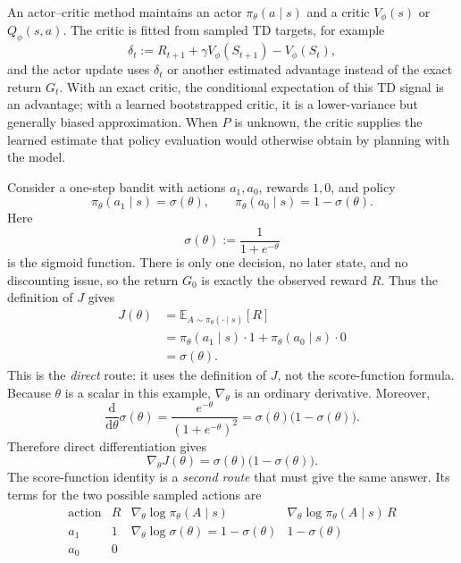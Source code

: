 \documentclass[11pt,a4paper]{article}
\theoremstyle{definition}
\begin{document}
\begin{definition}\label{def:actor-critic}
An actor--critic method maintains an actor $\pi_\theta(a\mid s)$ and a critic
$V_\phi(s)$ or $Q_\phi(s,a)$. The critic is fitted from sampled TD targets, for example
\[
\delta_t:=R_{t+1}+\gamma V_\phi(S_{t+1})-V_\phi(S_t),
\]
and the actor update uses $\delta_t$ or another estimated advantage instead of the exact
return $G_t$. With an exact critic, the conditional expectation of this TD signal is an
advantage; with a learned bootstrapped critic, it is a lower-variance but generally biased
approximation.
When $P$ is unknown, the critic supplies the learned estimate that policy evaluation would
otherwise obtain by planning with the model.
\end{definition}

\begin{example}
Consider a one-step bandit with actions $a_1,a_0$, rewards $1,0$, and policy
\[
\pi_\theta(a_1\mid s)=\sigma(\theta),
\qquad
\pi_\theta(a_0\mid s)=1-\sigma(\theta).
\]
Here
\[
\sigma(\theta):=\frac{1}{1+e^{-\theta}}
\]
is the sigmoid function. There is only one decision, no later state, and no discounting issue,
so the return $G_0$ is exactly the observed reward $R$. Thus the definition of $J$ gives
\[
\begin{aligned}
J(\theta)
&=\mathbb{E}_{A\sim\pi_\theta(\cdot\mid s)}[R]\\
&=\pi_\theta(a_1\mid s)\cdot1+\pi_\theta(a_0\mid s)\cdot0\\
&=\sigma(\theta).
\end{aligned}
\]
This is the \emph{direct} route: it uses the definition of $J$, not the score-function formula.
Because $\theta$ is a scalar in this example, $\nabla_\theta$ is an ordinary derivative.
Moreover,
\[
\frac{\mathrm{d}}{\mathrm{d}\theta}\sigma(\theta)
=\frac{e^{-\theta}}{(1+e^{-\theta})^2}
=\sigma(\theta)\bigl(1-\sigma(\theta)\bigr).
\]
Therefore direct differentiation gives
\[
\nabla_\theta J(\theta)=\sigma(\theta)\bigl(1-\sigma(\theta)\bigr).
\]
The score-function identity is a \emph{second route} that must give the same answer. Its
terms for the two possible sampled actions are
\[
\begin{array}{c|c|c|c}
\text{action} & R &
\nabla_\theta\log\pi_\theta(A\mid s) &
\nabla_\theta\log\pi_\theta(A\mid s)\,R\\
\hline
a_1 & 1 &
\nabla_\theta\log\sigma(\theta)=1-\sigma(\theta) &
1-\sigma(\theta)\\
a_0 & 0 &

\end{array}\]
\end{example}
\end{document}

